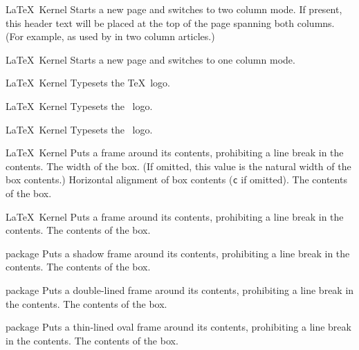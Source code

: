 %
 {}%
 {\LaTeX\ Kernel}%
 {Starts a new page and switches to two column mode.}%
 {%
   \BeginArgList
     If present, this header text will be
    placed at the top of the page spanning both columns. (For
    example, as used by  in two column articles.)
   \EndArgList
 }

%
 {}%
 {\LaTeX\ Kernel}%
 {Starts a new page and switches to one column mode.}%
 {}

%
 {}%
 {\LaTeX\ Kernel}%
 {Typesets the \TeX\ logo.}%
 {}

%
 {}%
 {\LaTeX\ Kernel}%
 {Typesets the \ logo.}%
 {}

%
 {}%
 {\LaTeX\ Kernel}%
 {Typesets the \ logo.}%
 {}

%
 {}%
 {\LaTeX\ Kernel}%
 {Puts a frame around its contents, prohibiting a line break in the
  contents.}%
 {%
   \BeginArgList
      The width of the box. (If omitted, this value is
      the natural width of the box contents.)
      Horizontal alignment of box contents
      (\texttt{c} if omitted).
      The contents of the box.
   \EndArgList
 }

%
 {}%
 {\LaTeX\ Kernel}%
 {Puts a frame around its contents, prohibiting a line break in the
  contents.}%
 {%
   \BeginArgList
      The contents of the box.
   \EndArgList
 }

%
 {}%
 { package}%
 {Puts a shadow frame around its contents, prohibiting a line break in the
  contents.}%
 {%
   \BeginArgList
      The contents of the box.
   \EndArgList
 }

%
 {}%
 { package}%
 {Puts a double-lined frame around its contents, prohibiting a line break in the
  contents.}%
 {%
   \BeginArgList
      The contents of the box.
   \EndArgList
 }

%
 {}%
 { package}%
 {Puts a thin-lined oval frame around its contents, prohibiting a line break in the
  contents.}%
 {%
   \BeginArgList
      The contents of the box.
   \EndArgList
 }


